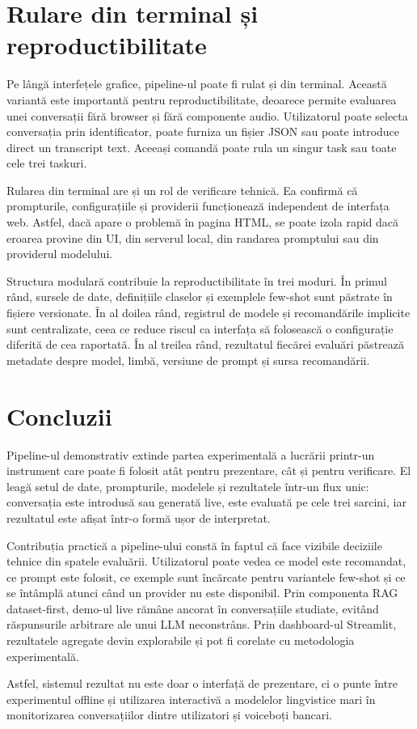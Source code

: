 \section{Rulare din terminal și reproductibilitate}
\label{sec:demo-pipeline-terminal}

Pe lângă interfețele grafice, pipeline-ul poate fi rulat și din terminal. Această variantă este importantă pentru reproductibilitate, deoarece permite evaluarea unei conversații fără browser și fără componente audio. Utilizatorul poate selecta conversația prin identificator, poate furniza un fișier JSON sau poate introduce direct un transcript text. Aceeași comandă poate rula un singur task sau toate cele trei taskuri.

Rularea din terminal are și un rol de verificare tehnică. Ea confirmă că prompturile, configurațiile și providerii funcționează independent de interfața web. Astfel, dacă apare o problemă în pagina HTML, se poate izola rapid dacă eroarea provine din UI, din serverul local, din randarea promptului sau din providerul modelului.

Structura modulară contribuie la reproductibilitate în trei moduri. În primul rând, sursele de date, definițiile claselor și exemplele few-shot sunt păstrate în fișiere versionate. În al doilea rând, registrul de modele și recomandările implicite sunt centralizate, ceea ce reduce riscul ca interfața să folosească o configurație diferită de cea raportată. În al treilea rând, rezultatul fiecărei evaluări păstrează metadate despre model, limbă, versiune de prompt și sursa recomandării.

\section{Concluzii}
\label{sec:demo-pipeline-concluzii}

Pipeline-ul demonstrativ extinde partea experimentală a lucrării printr-un instrument care poate fi folosit atât pentru prezentare, cât și pentru verificare. El leagă setul de date, prompturile, modelele și rezultatele într-un flux unic: conversația este introdusă sau generată live, este evaluată pe cele trei sarcini, iar rezultatul este afișat într-o formă ușor de interpretat.

Contribuția practică a pipeline-ului constă în faptul că face vizibile deciziile tehnice din spatele evaluării. Utilizatorul poate vedea ce model este recomandat, ce prompt este folosit, ce exemple sunt încărcate pentru variantele few-shot și ce se întâmplă atunci când un provider nu este disponibil. Prin componenta RAG dataset-first, demo-ul live rămâne ancorat în conversațiile studiate, evitând răspunsurile arbitrare ale unui LLM neconstrâns. Prin dashboard-ul Streamlit, rezultatele agregate devin explorabile și pot fi corelate cu metodologia experimentală.

Astfel, sistemul rezultat nu este doar o interfață de prezentare, ci o punte între experimentul offline și utilizarea interactivă a modelelor lingvistice mari în monitorizarea conversațiilor dintre utilizatori și voiceboți bancari.
